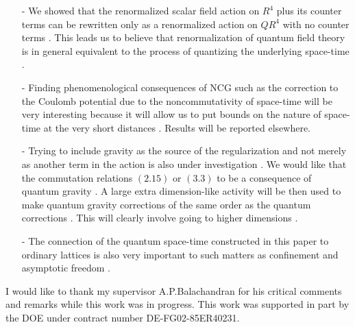 \documentclass[a4paper,12pt]{article}
\let\oldtheequation=\theequation
\def\doteqs#1{\setcounter{equation}{0}
            \def\theequation{{#1}.\oldtheequation}}
\newcounter{sxn}
\def\sx#1{\addtocounter{sxn}{1}
\medskip \goodbreak
\noindent{\large\bf
\centerline{\thesxn.~~#1}} \nobreak \medskip}
\def\sxn#1{\sx{#1} \doteqs{\thesxn}}
\begin{document}
\sxn{Conclusion}
\begin{itemize}

\item[-]We showed that the renormalized scalar field action on $R^4$
plus its counter terms can be rewritten only as a renormalized
action on $QR^4$ with no counter terms . This leads us to believe
that renormalization of quantum field theory is in general
equivalent to the process of quantizing the underlying space-time
.


\item[-]Finding phenomenological consequences of NCG such as the
correction to the Coulomb potential due to the noncommutativity of
space-time will be very interesting because it will allow us to
put  bounds on the nature of space-time at the very short
distances . Results will be reported elsewhere.

\item[-] Trying to include gravity as the source of the
regularization and not merely as another term in the action is
also under investigation . We would like that the commutation
relations $(2.15)$ or $(3.3)$ to be a consequence of quantum
gravity . A large extra dimension-like activity will be then used
to make quantum gravity corrections of the same order as the
quantum corrections . This will clearly involve going to higher
dimensions .

\item[-]The connection of the quantum space-time constructed in
this paper to ordinary lattices is also very important to such
matters as confinement and asymptotic freedom .
\end{itemize}

\vskip 5mm  \vskip 5mm
\noindent I would like to thank my supervisor A.P.Balachandran for
his critical comments and remarks while this work was in progress.
This work  was supported in part by the DOE under contract number
DE-FG02-85ER40231.


\end{document}
